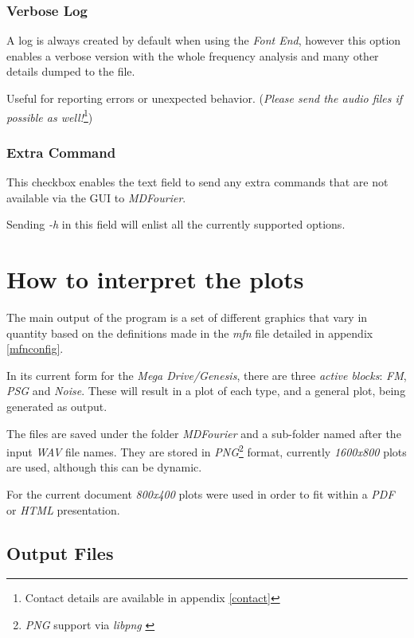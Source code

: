 \documentclass[10pt,a4paper]{report}
\begin{document}
\subsection{Verbose Log}

A log is always created by default when using the \textit{Font End}, however this option enables a verbose version with the whole frequency analysis and many other details dumped to the file. 

Useful for reporting errors or unexpected behavior. (\textit{Please send the audio files if possible as well!}\footnote{Contact details are available in appendix \ref{contact}})

\subsection{Extra Command}
\label{extracommand}

This checkbox enables the text field to send any extra commands that are not available via the GUI to \textit{MDFourier}. 

Sending \textit{-h} in this field will enlist all the currently supported options.

\chapter{How to interpret the plots}
\label{howtoplots}

The main output of the program is a set of different graphics that vary in quantity based on the definitions made in the \textit{mfn} file detailed in appendix \ref{mfnconfig}.

In its current form for the \textit{Mega Drive/Genesis}, there are three \textit{active blocks}: \textit{FM}, \textit{PSG} and \textit{Noise}. These will result in a plot of each type, and a general plot, being generated as output.

The files are saved under the folder \textit{MDFourier} and a sub-folder named after the input \textit{WAV} file names. They are stored in \textit{PNG}\footnote{\textit{PNG} support via \textit{libpng} \cite{libpng}} format, currently \textit{1600x800} plots are used, although this can be dynamic. 

For the current document \textit{800x400} plots were used in order to fit within a \textit{PDF} or \textit{HTML} presentation.

\section{Output Files}
\end{document}
